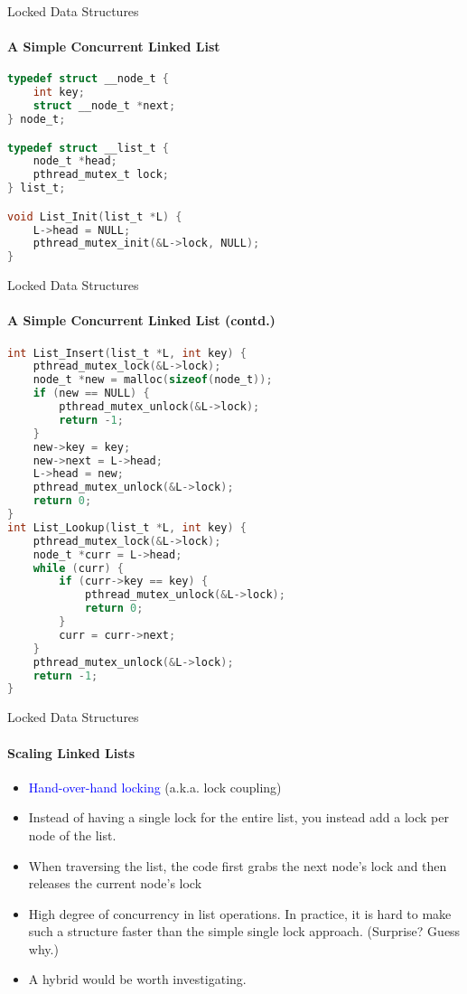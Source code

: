\documentclass[10pt]{beamer}
\begin{document}
\begin{frame}[fragile]{Locked Data Structures}
\framesubtitle{A Simple Concurrent Linked List}
\begin{lstlisting}[language=C]
typedef struct __node_t {
	int key;
 	struct __node_t *next;
} node_t;

typedef struct __list_t {
	node_t *head;
	pthread_mutex_t lock;
} list_t;

void List_Init(list_t *L) {
	L->head = NULL;
	pthread_mutex_init(&L->lock, NULL);
}
\end{lstlisting}
\end{frame}

\begin{frame}[fragile]{Locked Data Structures}
\framesubtitle{A Simple Concurrent Linked List (contd.)}
\begin{lstlisting}[language=C]
int List_Insert(list_t *L, int key) {
	pthread_mutex_lock(&L->lock);
	node_t *new = malloc(sizeof(node_t));
	if (new == NULL) {
		pthread_mutex_unlock(&L->lock);
		return -1; 
	}
	new->key = key;
	new->next = L->head;
	L->head = new;
	pthread_mutex_unlock(&L->lock);
	return 0; 
}
int List_Lookup(list_t *L, int key) {
	pthread_mutex_lock(&L->lock);
	node_t *curr = L->head;
	while (curr) {
		if (curr->key == key) {
			pthread_mutex_unlock(&L->lock);
			return 0;
		}
		curr = curr->next;
	}
	pthread_mutex_unlock(&L->lock);
	return -1;
}
\end{lstlisting}
\end{frame}

\begin{frame}{Locked Data Structures}
\framesubtitle{Scaling Linked Lists}
\begin{itemize}
 
\item \textcolor{blue}{Hand-over-hand locking} (a.k.a. lock coupling)
\item Instead of having a single lock for the entire list, you instead add a lock per node of the list.
\item When traversing the list, the code first grabs the next node's lock and then releases the current node's lock
\item High degree of concurrency in list operations.
In practice, it is hard to make such a structure faster than the simple single lock approach. (Surprise? Guess why.)
\item A hybrid would be worth investigating.
\end{itemize}
\end{frame}
\end{document}
